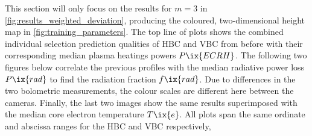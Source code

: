 %
            This section will only focus on the results for $m=3$ in \cref{fig:results_weighted_deviation}, producing the coloured, two-dimensional height map in \cref{fig:training_parameters}. The top line of plots shows the combined individual selection prediction qualities of HBC and VBC from before with their corresponding median plasma heatings powers $P\ix{ECRH}$. The following two figures below correlate the previous profiles with the median radiative power loss $P\ix{rad}$ to find the radiation fraction $f\ix{rad}$. Due to differences in the two bolometric measurements, the colour scales are different here between the cameras. Finally, the last two images show the same results superimposed with the median core electron temperature $T\ix{e}$. All plots span the same ordinate and abscissa ranges for the HBC and VBC respectively,\\%
